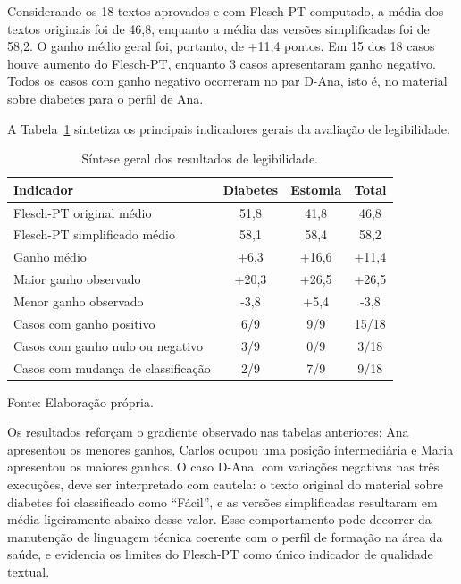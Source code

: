 Considerando os 18 textos aprovados e com Flesch-PT computado, a média dos textos originais foi de 46,8, enquanto a média das versões simplificadas foi de 58,2. O ganho médio geral foi, portanto, de +11,4 pontos. Em 15 dos 18 casos houve aumento do Flesch-PT, enquanto 3 casos apresentaram ganho negativo. Todos os casos com ganho negativo ocorreram no par D-Ana, isto é, no material sobre diabetes para o perfil de Ana.

A Tabela~\ref{tab:sintese-legibilidade} sintetiza os principais indicadores gerais da avaliação de legibilidade.

\begin{table}[htbp]
  \centering
  \caption{Síntese geral dos resultados de legibilidade.}
  \label{tab:sintese-legibilidade}
  \small
  \begin{tabularx}{\textwidth}{Xccc}
    \toprule
    \textbf{Indicador} & \textbf{Diabetes} & \textbf{Estomia} & \textbf{Total} \\
    \midrule
    Flesch-PT original médio & 51,8 & 41,8 & 46,8 \\
    Flesch-PT simplificado médio & 58,1 & 58,4 & 58,2 \\
    Ganho médio & +6,3 & +16,6 & +11,4 \\
    Maior ganho observado & +20,3 & +26,5 & +26,5 \\
    Menor ganho observado & -3,8 & +5,4 & -3,8 \\
    Casos com ganho positivo & 6/9 & 9/9 & 15/18 \\
    Casos com ganho nulo ou negativo & 3/9 & 0/9 & 3/18 \\
    Casos com mudança de classificação & 2/9 & 7/9 & 9/18 \\
    \bottomrule
  \end{tabularx}

  {\footnotesize Fonte: Elaboração própria.}
\end{table}

Os resultados reforçam o gradiente observado nas tabelas anteriores: Ana apresentou os menores ganhos, Carlos ocupou uma posição intermediária e Maria apresentou os maiores ganhos. O caso D-Ana, com variações negativas nas três execuções, deve ser interpretado com cautela: o texto original do material sobre diabetes foi classificado como ``Fácil'', e as versões simplificadas resultaram em média ligeiramente abaixo desse valor. Esse comportamento pode decorrer da manutenção de linguagem técnica coerente com o perfil de formação na área da saúde, e evidencia os limites do Flesch-PT como único indicador de qualidade textual.

